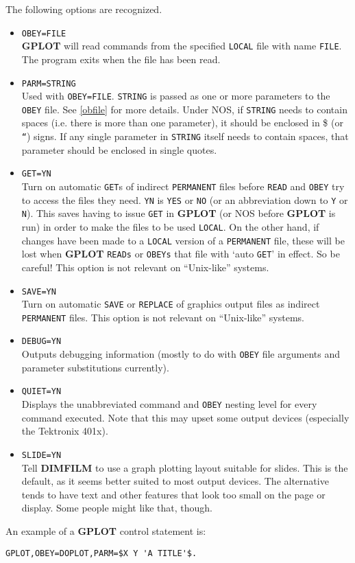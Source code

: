 \documentclass[a4paper,twoside,11pt]{article}
\newcommand{\newpara}{\par\vspace{4mm}\noindent}
\newcommand{\textttc}[1]{\texttt{\textcolor{OurRed}{#1}}}
\begin{document}
\newpara
The following options are recognized.
\begin{itemize}
\item \textttc{OBEY=FILE}\\
   \textbf{GPLOT} will read commands from the specified \texttt{LOCAL} file with name \texttt{FILE}. 
   The program exits when the file has been read.
\item \textttc{PARM=STRING}\\
   Used with \texttt{OBEY=FILE}. \texttt{STRING} is passed as one or more parameters to the \texttt{OBEY} file.
    See \ref{obfile} for more details.
   Under NOS, if \texttt{STRING} needs to contain spaces (i.e. there is more than one parameter), it should be enclosed in
   \$ (or \texttt{``}) signs. If any single parameter in \texttt{STRING} itself needs to contain spaces,
   that parameter should be enclosed in
   single quotes.
\item \textttc{GET=YN}\\
   Turn on automatic \texttt{GET}s of indirect \texttt{PERMANENT} files before \texttt{READ} and \texttt{OBEY} 
   try to access the files they need. \texttt{YN} is
   \texttt{YES} or \texttt{NO} (or an abbreviation down to \texttt{Y} or \texttt{N}). 
   This saves having to issue \texttt{GET} in \textbf{GPLOT} (or NOS before \textbf{GPLOT} is
   run) in order to make the files to be used \texttt{LOCAL}. On the other hand, if changes have been made to a \texttt{LOCAL} version
   of a \texttt{PERMANENT} file, these will be lost when \textbf{GPLOT} \texttt{READs} or \texttt{OBEYs} 
   that file with `auto \texttt{GET}' in effect. So be 
   careful! This option is not relevant on ``Unix-like'' systems.
 \item \textttc{SAVE=YN}\\
   Turn on automatic \texttt{SAVE} or \texttt{REPLACE} of graphics output files as indirect \texttt{PERMANENT} files.
   This option is not relevant on ``Unix-like'' systems.
\item \textttc{DEBUG=YN}\\
   Outputs debugging information (mostly to do with \texttt{OBEY} file arguments and parameter substitutions currently).
\item \textttc{QUIET=YN}\\
   Displays the unabbreviated command and \texttt{OBEY} nesting level for every command executed. Note that this may
   upset some output devices (especially the Tektronix 401x).
\item \textttc{SLIDE=YN}\\
	Tell \textbf{DIMFILM} to use a graph plotting layout suitable for slides. This is the default, as it seems better suited to most
	output devices. The alternative tends to have text and other features that look too small on the page or display. Some
	people might like that, though. 
\end{itemize}
An example of a \textbf{GPLOT} control statement is:
\begin{verbatim}
GPLOT,OBEY=DOPLOT,PARM=$X Y 'A TITLE'$.
\end{verbatim}
\end{document}
